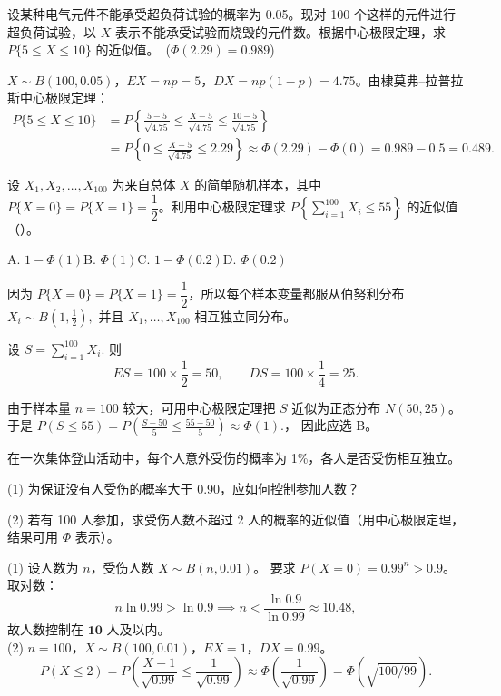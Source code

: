 \documentclass[lang=cn,11pt]{elegantbook}
\begin{document}
\begin{exercise}\label{exer:5-dml-burn}
设某种电气元件不能承受超负荷试验的概率为 0.05。现对 100 个这样的元件进行超负荷试验，以 \(X\) 表示不能承受试验而烧毁的元件数。根据中心极限定理，求 \(P\{5 \leq X \leq 10\}\) 的近似值。\ (\(\Phi(2.29) = 0.989\))
\end{exercise}
\begin{solution}
\(X \sim B(100, 0.05)\)，\(EX = np = 5\)，\(DX = np(1-p) = 4.75\)。由棣莫弗--拉普拉斯中心极限定理：
\[
\begin{aligned}
P\{5 \leq X \leq 10\}
&= P\!\left\{\frac{5 - 5}{\sqrt{4.75}} \leq \frac{X - 5}{\sqrt{4.75}} \leq \frac{10 - 5}{\sqrt{4.75}}\right\} \\
&= P\!\left\{0 \leq \frac{X - 5}{\sqrt{4.75}} \leq 2.29\right\}
\approx \Phi(2.29) - \Phi(0) = 0.989 - 0.5 = 0.489.
\end{aligned}
\]
\end{solution}


\begin{exercise}\label{exer:5-clt-bernoulli-sum}
设 \(X_1, X_2, \dots, X_{100}\) 为来自总体 \(X\) 的简单随机样本，其中 \(P\{X=0\} = P\{X=1\} = \dfrac{1}{2}\)。利用中心极限定理求 \(P\!\left\{\displaystyle\sum_{i=1}^{100} X_i \leq 55\right\}\) 的近似值（\quad）。\par
A. \(1 - \Phi(1)\)\quad B. \(\Phi(1)\)\quad C. \(1 - \Phi(0.2)\)\quad D. \(\Phi(0.2)\)
\end{exercise}
\begin{solution}
因为 \(P\{X=0\}=P\{X=1\}=\dfrac12\)，所以每个样本变量都服从伯努利分布
\(
X_i\sim B\!\left(1,\frac12\right),
\)
并且 \(X_1,\dots,X_{100}\) 相互独立同分布。

设
\(
S=\sum_{i=1}^{100} X_i.
\)
则
\[
ES=100\times \frac12=50,\qquad DS=100\times \frac14=25.
\]

由于样本量 \(n=100\) 较大，可用中心极限定理把 \(S\) 近似为正态分布 \(N(50,25)\)。于是
\(
P(S \leq 55) = P\!\left(\frac{S - 50}{5} \leq \frac{55 - 50}{5}\right) \approx \Phi(1).
\)，
因此应选 B。
\end{solution}

\begin{exercise}\label{exer:5-climb}
在一次集体登山活动中，每个人意外受伤的概率为 1\%，各人是否受伤相互独立。\par
(1) 为保证没有人受伤的概率大于 0.90，应如何控制参加人数？\par
(2) 若有 100 人参加，求受伤人数不超过 2 人的概率的近似值（用中心极限定理，结果可用 \(\Phi\) 表示）。
\end{exercise}
\begin{solution}
(1) 设人数为 \(n\)，受伤人数 \(X \sim B(n, 0.01)\)。
要求 \(P(X = 0) = 0.99^n > 0.9\)。取对数：
\[
n\ln 0.99 > \ln 0.9 \implies n < \frac{\ln 0.9}{\ln 0.99} \approx 10.48,
\]
故人数控制在 \(\mathbf{10}\) 人及以内。\\
(2) \(n = 100\)，\(X \sim B(100, 0.01)\)，\(EX = 1\)，\(DX = 0.99\)。
\[
P(X \leq 2) = P\!\left(\frac{X-1}{\sqrt{0.99}} \leq \frac{1}{\sqrt{0.99}}\right) \approx \Phi\!\left(\frac{1}{\sqrt{0.99}}\right) = \Phi(\sqrt{100/99}).
\]
\end{solution}
\end{document}
